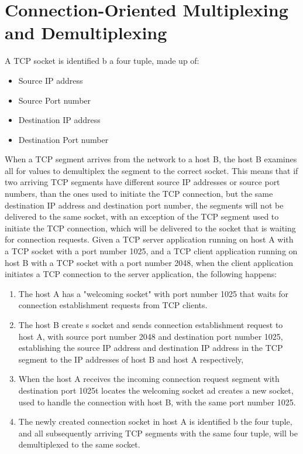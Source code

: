 \documentclass[12pt letter]{report}
\begin{document}
\section{Connection-Oriented Multiplexing and Demultiplexing}

A TCP socket is identified b a four tuple, made up of:
\begin{itemize}
  \item Source IP address
  \item Source Port number
  \item Destination IP address
  \item Destination Port number
\end{itemize}
When a TCP segment arrives from the network to a host B, the host B
examines all for values to demultiplex the segment to the correct
socket. This means that if two arriving TCP segments have different
source IP addresses or source port numbers, than the ones used to
initiate the TCP connection, but the same destination IP address and
destination port number, the segments will not be delivered to the
same socket, with an exception of the TCP segment used to initiate
the TCP connection, which will be delivered to the socket that is
waiting for connection requests. Given a TCP server application
running on host A with a TCP socket with a port number 1025, and a
TCP client application running on host B with a TCP socket with a
port number 2048, when the client application initiates a TCP
connection to the server application, the following happens:
\begin{enumerate}
  \item The host A has a "welcoming socket" with port number 1025
    that waits for connection establishment requests from TCP clients.
  \item The host B create s socket and sends connection establishment
    request to host A, with source port number 2048 and destination
    port number 1025,  establishing the source IP address and
    destination IP address in the TCP segment to the IP addresses of
    host B and host A respectively,
  \item  When the host A receives the incoming connection request
    segment with destination port 1025t locates the welcoming socket
    ad creates a new socket, used to handle the connection with host
    B, with the same port number 1025.
  \item The newly created connection socket in host A is identified b
    the four tuple, and all subsequently arriving TCP segments with
    the same four tuple, will be demultiplexed to the same socket.
\end{enumerate}
\end{document}
